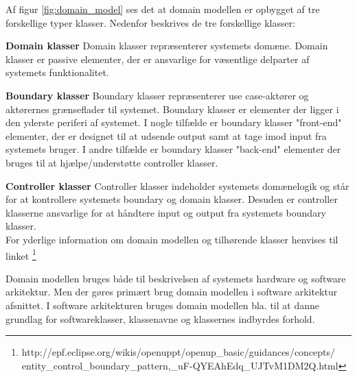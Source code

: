 \newpage

Af figur \ref{fig:domain_model} ses det at domain modellen er opbygget af tre forskellige typer klasser. Nedenfor beskrives de tre forskellige klasser:

\textbf{Domain klasser}\newline
Domain klasser repræsenterer systemets domæne. Domain klasser er passive elementer, der er ansvarlige for væsentlige delparter af systemets funktionalitet.  

\textbf{Boundary klasser}\newline
Boundary klasser repræsenterer use case-aktører og aktørernes grænseflader til systemet. Boundary klasser er elementer der ligger i den yderste periferi af systemet. I nogle tilfælde er boundary klasser "front-end" elementer, der er designet til at udsende output samt at tage imod input fra systemets bruger. I andre tilfælde er boundary klasser "back-end" elementer der bruges til at hjælpe/understøtte controller klasser.

\textbf{Controller klasser} \newline
Controller klasser indeholder systemets domænelogik og står for at kontrollere systemets boundary og domain klasser. Desuden er controller klasserne ansvarlige for at håndtere input og output fra systemets boundary klasser.\\

For yderlige information om domain modellen og tilhørende klasser henvises til linket \footnote{http://epf.eclipse.org/wikis/openuppt/openup\_basic/guidances/concepts/ \newline entity\_control\_boundary\_pattern,\_uF-QYEAhEdq\_UJTvM1DM2Q.html}

\vspace{0.5cm}

Domain modellen bruges både til beskrivelsen af systemets hardware og software arkitektur. Men der gøres primært brug domain modellen i software arkitektur afsnittet. I software arkitekturen bruges domain modellen bla. til at danne grundlag for softwareklasser, klassenavne og klassernes indbyrdes forhold.








